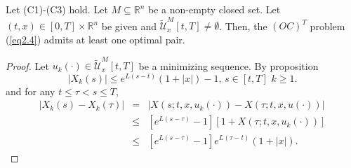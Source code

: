     \begin{theorem}\label{thm:ExistsTheo}
    	Let (C1)-(C3) hold. Let $M\subseteq \mathbb{R}^n$ be a non-empty closed set. 
    	Let $(t,x)\in [0,T]\times\mathbb{R}^n$ be given and 
    	$\tilde{\mathcal{U}}^M_x[t,T]\neq \emptyset$. Then, the $(OC)^T$ problem
    	(\ref{eq2.4}) admits at least one optimal pair.
    \end{theorem}
    \begin{proof}
        Let $u_k(\cdot)\in\tilde{\mathcal{U}}^M_x[t,T]$ be a minimizing sequence. 
        By proposition 
        \begin{equation}\label{eq2.5}
            |X_k(s)|\leq e^{L(s-t)}(1+|x|)-1,\, s\in [t,T] \,\,k\geq 1.
        \end{equation}
        and for any $t\leq \tau<s\leq T$,
        \begin{eqnarray*}
            |X_k(s)-X_k(\tau)|&=& |X(s;t,x,u_k(\cdot))-X(\tau;t,x,u(\cdot))|\\
            &\leq& [e^{L(s-\tau)}-1][1+X(\tau;t,x,u_k(\cdot))]\\
            &\leq& [e^{L(s-\tau)}-1]e^{L(\tau-t)}(1+|x|).
        \end{eqnarray*}
        

\end{proof}
